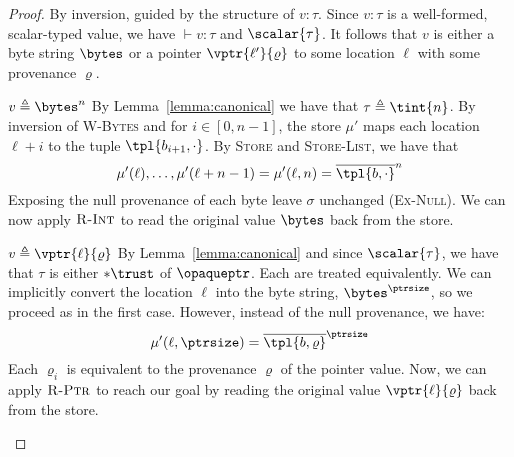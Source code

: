 \begin{proof}
By inversion, guided by the structure of ${v:\tau}$. Since ${v:\tau}$ is a well-formed, scalar-typed value, we have ${\vdash v:\tau}$ and $\scalar{\tau}$. It follows that $v$ is either a byte string $\bytes$ or a pointer $\vptr{\ell'}{\varrho}$ to some location $\ell$ with some provenance $\varrho$.
\begin{bycases}
\begin{case}{$v\triangleq \bytes^n$}
By Lemma~\ref{lemma:canonical} we have that ${\tau \triangleq \tint{n}}$. By inversion of \textsc{W-Bytes} and for ${i \in [0, n - 1]}$, the store $\mu'$ maps each location ${\ell + i}$ to the tuple ${\tpl{b_{i+1}, \cdot}}$. By \textsc{Store} and \textsc{Store-List}, we have that
\[
\mu'(\ell), \ldots, \mu'(\ell + n-1) = \mu'(\ell, n) = \overline{\tpl{b, \cdot}}^n
\]
Exposing the null provenance of each byte leave $\sigma$ unchanged (\textsc{Ex-Null}). We can now apply $\textsc{R-Int}$ to read the original value $\bytes$ back from the store. 
\end{case}
\begin{case}{$v\triangleq \vptr{\ell}{\varrho}$}
By Lemma~\ref{lemma:canonical} and since $\scalar{\tau}$, we have that $\tau$ is either $*\trust$ of $\opaqueptr$. Each are treated equivalently. We can implicitly convert the location $\ell$ into the byte string, $\bytes^\ptrsize$, so we proceed as in the first case. However, instead of the null provenance, we have:
$${\mu'(\ell, \ptrsize) = \overline{\tpl{b, \varrho}}^{\ptrsize}}$$
Each $\varrho_i$ is equivalent to the provenance $\varrho$ of the pointer value. Now, we can apply $\textsc{R-Ptr}$ to reach our goal by reading the original value $\vptr{\ell}{\varrho}$ back from the store.
\end{case}
\end{bycases}
\end{proof}